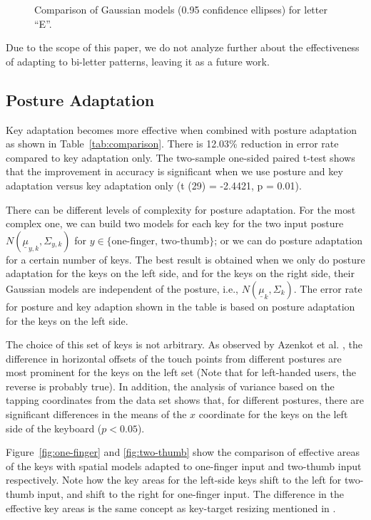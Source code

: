 \documentclass{sigchi}
\begin{document}
\begin{figure}

 \caption{Comparison of Gaussian models (0.95 confidence ellipses) for letter
``E''.}
\end{figure}

Due to the scope of this paper, we do not analyze further about the
effectiveness of adapting to bi-letter patterns, leaving it as a future
work.

\subsection{Posture Adaptation}
Key adaptation becomes more effective when combined with posture adaptation as
shown in Table~\ref{tab:comparison}. There is 12.03\% reduction in error rate 
compared to key adaptation only. The two-sample one-sided paired t-test shows
that the improvement in accuracy is significant when we use posture and key 
adaptation versus key adaptation only (t (29) = -2.4421, p = 0.01).

There can be different levels of complexity for posture adaptation. For the most complex one, we can build two models for each key for the 
two input posture $N(\underline \mu_{y,k}, \Sigma_{y,k})$ for $y \in
\{\text{one-finger, two-thumb}\}$; or we can do posture adaptation for a certain
number of keys.
The best result is obtained when we only do posture adaptation for the keys on 
the left side, and for the keys on the right side, their Gaussian models are
independent of the posture, i.e., $N(\underline\mu_k, \Sigma_k)$.
The error rate for posture and key adaption shown in the table is based on 
posture adaptation for the keys on the left side. 

The choice of this set of keys is not arbitrary. As observed by Azenkot et al. \cite{Azenkot:2012}, the difference in horizontal
offsets of the touch points from different postures are most prominent for the keys on the
left set (Note that for left-handed users, the reverse is probably true). 
In addition, the analysis of variance based on the tapping coordinates from the
data set shows that, for different postures, there are significant differences in the means of
the $x$ coordinate for the keys on the left side of the keyboard ($p < 0.05$). 

Figure~\ref{fig:one-finger} and \ref{fig:two-thumb} show the comparison of effective areas of the keys
with spatial models adapted to one-finger input and two-thumb input respectively. Note how the key areas for the left-side keys shift to the left
for two-thumb input, and shift to the right for one-finger input. The difference in 
the effective key areas is the same concept as key-target resizing mentioned in \cite{Rudchenko:2011, Gunawardana:2010}.
\end{document}
